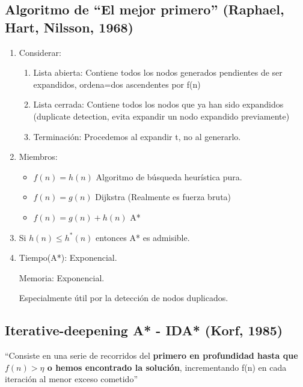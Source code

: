 \documentclass[12pt, twoside, openright]{report} %
\begin{document}
\subsection{Algoritmo de \enquote{El mejor primero} (Raphael, Hart, Nilsson, 1968)}


\begin{enumerate}
	\item Considerar:

	      \begin{enumerate}
		      \item Lista abierta: Contiene todos los nodos generados pendientes de
		            ser expandidos, ordena=dos ascendentes por f(n)
		      \item Lista cerrada: Contiene todos los nodos que ya han sido expandidos
		            (duplicate detection, evita expandir un nodo expandido
		            previamente)
		      \item Terminación: Procedemos al expandir t, no al generarlo.
	      \end{enumerate}
	\item Miembros:
	      \begin{itemize}
		      \item \(f(n)=h(n)\) Algoritmo de búsqueda heurística pura.
		      \item \(f(n)=g(n)\) Dijkstra (Realmente es fuerza bruta)
		      \item \(f(n) = g(n) + h(n)\) A*
	      \end{itemize}
	\item Si \(h(n) \leq h^*(n)\) entonces A* es admisible.
	\item Tiempo(A*): Exponencial.

	      Memoria: Exponencial.

	      Especialmente útil por la detección de nodos duplicados.

\end{enumerate}

\subsection{Iterative-deepening A* - IDA* (Korf, 1985)}

\enquote{Consiste en una serie de recorridos del \textbf{primero en
	profundidad hasta que \(f(n) > \eta\) o hemos encontrado la solución},
incrementando f(n) en cada iteración al menor exceso cometido}
\end{document}
